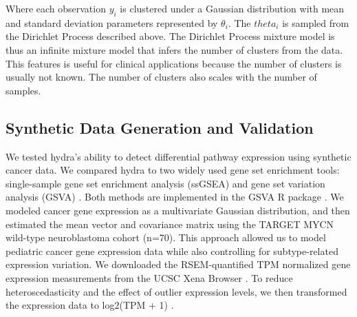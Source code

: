 \documentclass[10pt,letterpaper]{article}
\begin{document}
Where each observation $y_i$ is clustered under a Gaussian distribution with mean and standard deviation parameters represented by $\theta_i$. The $theta_i$ is sampled from the Dirichlet Process described above. The Dirichlet Process mixture model is thus an infinite mixture model that infers the number of clusters from the data. This features is useful for clinical applications because the number of clusters is usually not known. The number of clusters also scales with the number of samples.

\subsection*{Synthetic Data Generation and Validation}
We tested hydra's ability to detect differential pathway expression using synthetic cancer data. We compared hydra to two widely used gene set enrichment tools: single-sample gene set enrichment analysis (ssGSEA) and gene set variation analysis (GSVA) \cite{barbieSystematicRNAInterference2009, hanzelmannGSVAGeneSet2013, tarcaComparisonGeneSet2013}. Both methods are implemented in the GSVA R package \cite{hanzelmannGSVAGeneSet2013}. We modeled cancer gene expression as a multivariate Gaussian distribution, and then estimated the mean vector and covariance matrix using the TARGET MYCN wild-type neuroblastoma cohort (n=70). This approach allowed us to model pediatric cancer gene expression data while also controlling for subtype-related expression variation. We downloaded the RSEM-quantified TPM normalized gene expression measurements from the UCSC Xena Browser \cite{goldmanUCSCXenaPlatform2018}. To reduce heteroscedasticity and the effect of outlier expression levels, we then transformed the expression data to log2(TPM + 1) \cite{zwienerTransformingRNASeqData2014}.
 
\end{document}
